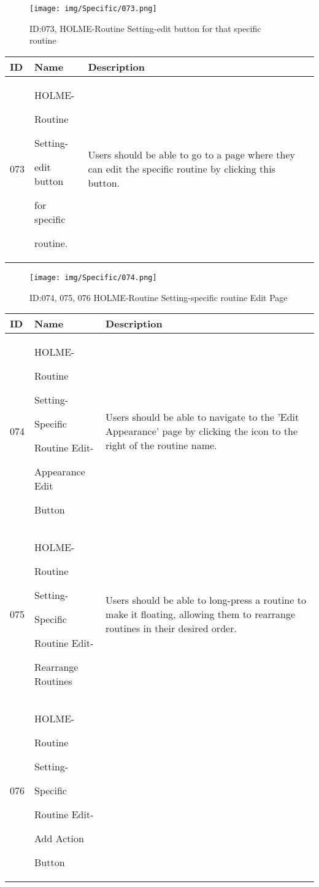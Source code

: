 \documentclass[conference]{IEEEtran}
\begin{document}
\begin{enumerate}
\begin{figure}[h]
\centering
\texttt{[image: img/Specific/073.png]}
\caption{ID:073, HOLME-Routine Setting-edit button for that specific routine}
\end{figure}
\begin{table}[h]
\def\arraystretch{1.2} \small
    \begin{tabular}{|p{1cm}|p{1.8cm}|p{5.0cm}|}
        \hline
        ID & Name & Description\\ \hline
         073 \par  & HOLME-\par Routine \par Setting- \par edit button \par  for specific \par  routine.  & 
Users should be able to go to a page where they can edit the specific routine by clicking this button. \\ \hline
    \end{tabular}
\end{table}


\begin{figure}[h]
\centering                                         
\texttt{[image: img/Specific/074.png]}
\caption{ID:074, 075, 076 HOLME-Routine Setting-specific routine Edit Page}
\end{figure}
\begin{table}[h]
\def\arraystretch{1.2} \small
    \begin{tabular}{|p{1cm}|p{1.8cm}|p{5.0cm}|}
        \hline
        ID & Name & Description\\ \hline
         074 \par  & HOLME-\par Routine \par Setting- \par Specific  \par Routine Edit- \par Appearance Edit \par Button & 
Users should be able to navigate to the 'Edit Appearance' page by clicking the icon to the right of the routine name.\\ \hline
075 \par  & HOLME-\par Routine \par Setting- \par Specific  \par Routine Edit- \par Rearrange Routines & 
Users should be able to long-press a routine to make it floating, allowing them to rearrange routines in their desired order.\\ \hline
076 \par  & HOLME-\par Routine \par Setting- \par Specific  \par Routine Edit- \par Add Action \par Button & 


\end{tabular}
\end{table}
\end{enumerate}
\end{document}
